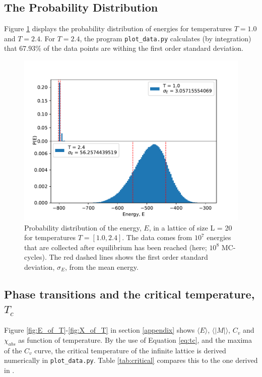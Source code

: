 \documentclass[12pt,english,a4paper]{article}
\begin{document}
\subsection{The Probability Distribution}
Figure \ref{fig:probability} displays the probability distribution of energies for temperatures $T=1.0$ and $T=2.4$. For $T=2.4$, the program \texttt{plot\_data.py} calculates (by integration) that $67.93\%$ of the data points are withing the first order standard deviation.
\begin{figure}[H]
    \centering
    \includegraphics[scale=0.7]{Figures/Probability_Distribution_N_1000000000_L_20.pdf}
    \caption{Probability distribution of the energy, $E$, in a lattice of size L = 20 for temperatures $T = [1.0,2.4]$. The data comes from $10^7$ energies that are collected after equilibrium has been reached (here; $10^8$ MC-cycles). The red dashed lines shows the first order standard deviation, $\sigma_E$, from the mean energy.}
    \label{fig:probability}
\end{figure}

\subsection{Phase transitions and the critical temperature, $T_c$}

Figure \ref{fig:E_of_T}-\ref{fig:X_of_T} in section \ref{appendix} shows $\langle E\rangle$, $\langle |M|\rangle$, $C_v$ and $\chi_{abs}$ as function of temperature. By the use of Equation \eqref{eq:tc}, and the maxima of the $C_v$ curve, the critical temperature of the infinite lattice is derived numerically in \texttt{plot\_data.py}. Table \ref{tab:critical} compares this to the one derived in \cite{LarsOns}. 
\end{document}
